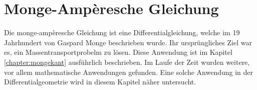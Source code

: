 %
%
%
%
\chapter{Monge-Ampèresche Gleichung\label{chapter:mongeampere}}
\begin{refsection}

Die monge-ampèresche Gleichung ist eine Differentialgleichung, welche
im 19 Jahrhundert von Gaspard Monge beschrieben wurde. 
Ihr ursprüngliches Ziel war es, ein Massentransportprobelm zu lösen. 
Diese Anwendung ist im Kapitel \ref{chapter:mongekant} ausführlich beschrieben.
Im Laufe der Zeit wurden weitere, vor allem mathematische Anwendungen
gefunden.
Eine solche Anwendung in der Differentialgeometrie wird in diesem Kapitel näher 
untersucht.




% 

\printbibliography[heading=subbibliography]
\end{refsection}
